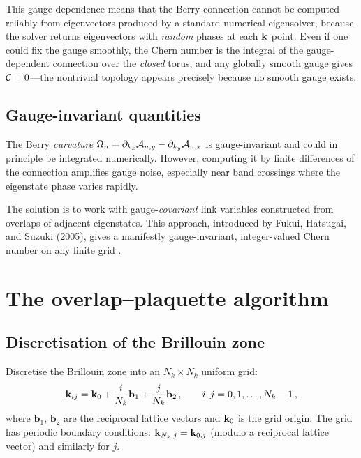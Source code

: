 This gauge dependence means that the Berry connection cannot be
computed reliably from eigenvectors produced by a standard numerical
eigensolver, because the solver returns eigenvectors with \emph{random}
phases at each $\mathbf{k}$ point.  Even if one could fix the gauge
smoothly, the Chern number is the integral of the gauge-dependent
connection over the \emph{closed} torus, and any globally smooth gauge
gives $\mathcal{C}=0$---the nontrivial topology appears precisely because
no smooth gauge exists.

\subsection{Gauge-invariant quantities}
\label{sec:ch10-gauge-invariant}

The Berry \emph{curvature} $\Omega_n=\partial_{k_x}\mathcal{A}_{n,y}
-\partial_{k_y}\mathcal{A}_{n,x}$ is gauge-invariant and could in
principle be integrated numerically.  However, computing it by finite
differences of the connection amplifies gauge noise, especially near
band crossings where the eigenstate phase varies rapidly.

The solution is to work with gauge-\emph{covariant} link variables
constructed from overlaps of adjacent eigenstates.  This approach,
introduced by Fukui, Hatsugai, and Suzuki (2005), gives a manifestly
gauge-invariant, integer-valued Chern number on any finite grid
\cite{zhao2020first}.

\section{The overlap--plaquette algorithm}
\label{sec:ch10-plaquette}

\subsection{Discretisation of the Brillouin zone}
\label{sec:ch10-discretisation}

Discretise the Brillouin zone into an $N_k\times N_k$ uniform grid:
\begin{equation}\label{eq:ch10-grid}
  \mathbf{k}_{ij} = \mathbf{k}_0 + \frac{i}{N_k}\mathbf{b}_1 + \frac{j}{N_k}\mathbf{b}_2\,,
  \qquad i,j=0,1,\ldots,N_k-1\,,
\end{equation}
where $\mathbf{b}_1$, $\mathbf{b}_2$ are the reciprocal lattice vectors
and $\mathbf{k}_0$ is the grid origin.  The grid has periodic boundary
conditions: $\mathbf{k}_{N_k,j}=\mathbf{k}_{0,j}$ (modulo a reciprocal lattice
vector) and similarly for $j$.

